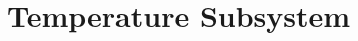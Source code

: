\documentclass[../main]{subfiles}
\begin{document}
\chapter{Temperature Subsystem} \label{chp:tempSubsys}

%


\end{document}
